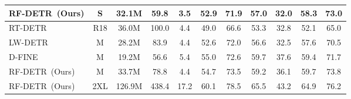 \documentclass{article} %
\newcommand{\method}{RF-DETR}
\begin{document}
{\begin{table}[t]
{\begin{tabular}{|lcccccccccc|}
\multicolumn{1}{|l|}{\method \ (Ours)}     & \multicolumn{1}{c|}{S}     &    32.1M   &   59.8     & \multicolumn{1}{c|}{3.5}             &  52.9  &  71.9    &   57.0   &  32.0   &  58.3   &  73.0   \\ \hline \hline
\multicolumn{1}{|l|}{RT-DETR \citep{zhao2024rtdetr}}      & \multicolumn{1}{c|}{R18}     &   36.0M    &    100.0    & \multicolumn{1}{c|}{4.4}             &  49.0  &   66.6   &   53.3   &  32.8   &   52.1  &   65.0  \\ \hline
\multicolumn{1}{|l|}{LW-DETR \citep{chen2024lw}}      & \multicolumn{1}{c|}{M}     &    28.2M   &    83.9    & \multicolumn{1}{c|}{4.4}             &  52.6  &   72.0   &   56.6   &   32.5  &  57.6   &  70.5   \\ \hline
\multicolumn{1}{|l|}{D-FINE \citep{peng2024dfine}}      & \multicolumn{1}{c|}{M}     &    19.2M   &    56.6    & \multicolumn{1}{c|}{5.4}             &  55.0  &   72.6   &   59.7   &  37.6   &  59.4   &  71.7   \\ \hline
\multicolumn{1}{|l|}{\method \ (Ours)}     & \multicolumn{1}{c|}{M}     &  33.7M     &   78.8     & \multicolumn{1}{c|}{4.4}             &  54.7  &   73.5   &   59.2   &  36.1   &  59.7   &  73.8   \\ \hline \hline
\multicolumn{1}{|l|}{\method \ (Ours)}     & \multicolumn{1}{c|}{2XL}     &    126.9M   &    438.4    & \multicolumn{1}{c|}{17.2}             &  60.1   &   78.5   &   65.5   &   43.2   &   64.9   &   76.2\\ \hline

\end{tabular}}
\end{table}}
\end{document}
